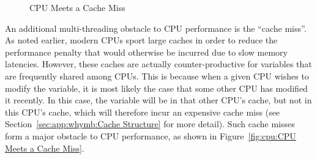 \begin{figure}[htb]
\begin{center}
\end{center}
\caption{CPU Meets a Cache Miss}
\end{figure}

An additional multi-threading obstacle to CPU performance is
the ``cache miss''.
As noted earlier, modern CPUs sport large caches in order to reduce the
performance penalty that would otherwise be incurred due to slow memory
latencies.
However, these caches are actually counter-productive for variables that
are frequently shared among CPUs.
This is because when a given CPU wishes to modify the variable, it is
most likely the case that some other CPU has modified it recently.
In this case, the variable will be in that other CPU's cache, but not
in this CPU's cache, which will therefore incur an expensive cache miss
(see Section~\ref{sec:app:whymb:Cache Structure} for more detail).
Such cache misses form a major obstacle to CPU performance, as shown
in Figure~\ref{fig:cpu:CPU Meets a Cache Miss}.

